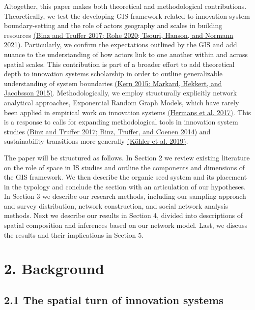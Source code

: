 \documentclass[twoside,12pt,final]{ucthesis-CA2012}
\begin{document}
\begin{ucmainmatter}
Altogether, this paper makes both theoretical and methodological
contributions. Theoretically, we test the developing GIS framework
related to innovation system boundary-setting and the role of actors\textquotesingle{}
geography and scales in building resources \href{https://www.zotero.org/google-docs/?QzOD3N}{(Binz and Truffer 2017; Rohe
2020; Tsouri, Hanson, and Normann
2021)}. Particularly, we
confirm the expectations outlined by the GIS and add nuance to the
understanding of how actors link to one another within and across
spatial scales. This contribution is part of a broader effort to add
theoretical depth to innovation systems scholarship in order to outline
generalizable understanding of system boundaries \href{https://www.zotero.org/google-docs/?CjIvG8}{(Kern 2015; Markard,
Hekkert, and Jacobsson
2015)}. Methodologically, we
employ structurally explicitly network analytical approaches,
Exponential Random Graph Models, which have rarely been applied in
empirical work on innovation systems \href{https://www.zotero.org/google-docs/?tANSkn}{(Hermans et al.
2017)}. This is a response
to calls for expanding methodological tools in innovation system studies
\href{https://www.zotero.org/google-docs/?zqxnGC}{(Binz and Truffer 2017; Binz, Truffer, and Coenen
2014)} and sustainability
transitions more generally \href{https://www.zotero.org/google-docs/?RHlq3v}{(Köhler et al.
2019)}.

The paper will be structured as follows. In Section 2 we review existing
literature on the role of space in IS studies and outline the components
and dimensions of the GIS framework. We then describe the organic seed
system and its placement in the typology and conclude the section with
an articulation of our hypotheses. In Section 3 we describe our research
methods, including our sampling approach and survey distribution,
network construction, and social network analysis methods. Next we
describe our results in Section 4, divided into descriptions of spatial
composition and inferences based on our network model. Last, we discuss
the results and their implications in Section 5.

\hypertarget{background-1}{%
\section{2. Background}\label{background-1}}

\hypertarget{the-spatial-turn-of-innovation-systems}{%
\subsection{2.1 The spatial turn of innovation systems}\label{the-spatial-turn-of-innovation-systems}}


\end{ucmainmatter}
\end{document}
